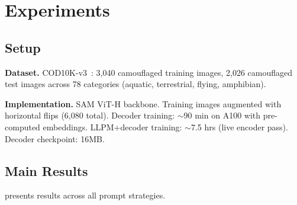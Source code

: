\section{Experiments}

\subsection{Setup}

\noindent\textbf{Dataset.} COD10K-v3~\cite{fan2020cod10k}: 3,040 camouflaged training images, 2,026 camouflaged test images across 78 categories (aquatic, terrestrial, flying, amphibian).

\noindent\textbf{Implementation.} SAM ViT-H backbone. Training images augmented with horizontal flips (6,080 total). Decoder training: $\sim$90 min on A100 with pre-computed embeddings. LLPM+decoder training: $\sim$7.5 hrs (live encoder pass). Decoder checkpoint: 16MB.

\subsection{Main Results}

 presents results across all prompt strategies.

